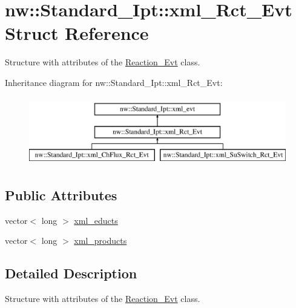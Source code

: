 \hypertarget{structnw_1_1_standard___ipt_1_1xml___rct___evt}{\section{nw\+:\+:Standard\+\_\+\+Ipt\+:\+:xml\+\_\+\+Rct\+\_\+\+Evt Struct Reference}
\label{structnw_1_1_standard___ipt_1_1xml___rct___evt}
}


Structure with attributes of the \hyperlink{classnw_1_1_reaction___evt}{Reaction\+\_\+\+Evt} class.  


Inheritance diagram for nw\+:\+:Standard\+\_\+\+Ipt\+:\+:xml\+\_\+\+Rct\+\_\+\+Evt\+:\begin{figure}[H]
\begin{center}
\leavevmode
\includegraphics[height=3.000000cm]{d4/d3d/structnw_1_1_standard___ipt_1_1xml___rct___evt}
\end{center}
\end{figure}
\subsection*{Public Attributes}
\begin{DoxyCompactItemize}
\item 
vector$<$ long $>$ \hyperlink{structnw_1_1_standard___ipt_1_1xml___rct___evt_a7bee357e0554eb7a6bba9fff6624e5ad}{xml\+\_\+educts}
\item 
vector$<$ long $>$ \hyperlink{structnw_1_1_standard___ipt_1_1xml___rct___evt_a2c8054ac2dbef43234927778f80ae4e6}{xml\+\_\+products}
\end{DoxyCompactItemize}


\subsection{Detailed Description}
Structure with attributes of the \hyperlink{classnw_1_1_reaction___evt}{Reaction\+\_\+\+Evt} class. 

